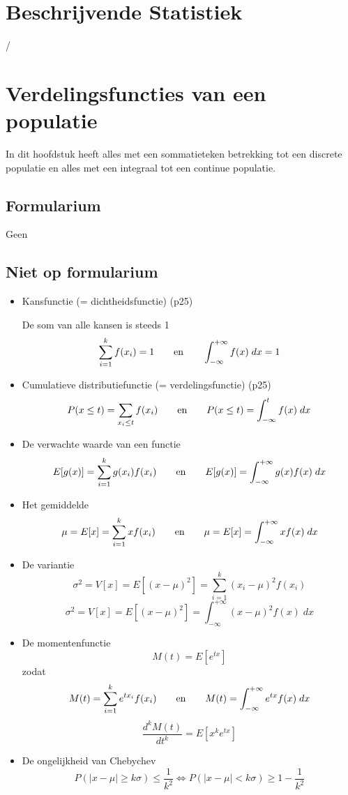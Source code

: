\documentclass[12pt]{report}
\begin{document}
\chapter{Beschrijvende Statistiek}
/
\chapter{Verdelingsfuncties van een populatie}
In dit hoofdstuk heeft alles met een sommatieteken betrekking tot een discrete populatie en alles met een integraal tot een continue populatie.
 \section{Formularium}
 Geen
 \section{Niet op formularium}
 \begin{itemize}
  \item Kansfunctie (= dichtheidsfunctie) (p25)
  
    De som van alle kansen is steeds 1
    $$\sum_{i=1}^k f(x_i) = 1 \qquad \hbox{en}\qquad \int_{-\infty}^{+\infty}f(x)\;dx = 1$$
  \item Cumulatieve distributiefunctie (= verdelingsfunctie) (p25)
    $$P(x \leq t) = \sum_{x_i \leq t}f(x_i) \qquad\hbox{en}\qquad P(x \leq t) = \int_{-\infty}^{t}f(x)\;dx$$
  \item De verwachte waarde van een functie
    $$E[g(x)] = \sum_{i = 1}^{k}g(x_i)f(x_i) \qquad\hbox{en}\qquad E[g(x)] = \int_{-\infty}^{+\infty}g(x)f(x)\;dx$$
  \item Het gemiddelde
    $$\mu = E[x] = \sum_{i = 1}^{k}xf(x_i)\qquad\hbox{en}\qquad \mu = E[x] = \int_{-\infty}^{+\infty}xf(x)\;dx$$
  \item De variantie
    $$\sigma^2 = V[x] = E[(x - \mu)^2] = \sum_{i = 1}^{k}(x_i - \mu)^2f(x_i)$$
    $$\sigma^2 = V[x] = E[(x - \mu)^2] = \int_{-\infty}^{+\infty}(x - \mu)^2f(x)\;dx$$
  \item De momentenfunctie
    $$M(t) = E[e^{tx}]$$
    zodat
    $$M(t) = \sum_{i = 1}^{k}e^{tx_i}f(x_i)\qquad\hbox{en}\qquad M(t) = \int_{-\infty}^{+\infty}e^{tx}f(x)\;dx$$
    $$\frac{d^kM(t)}{dt^k} = E[x^ke^{tx}]$$
  \item De ongelijkheid van Chebychev
    $$P(|x - \mu| \geq k\sigma) \leq \frac{1}{k^2} \Leftrightarrow P(|x - \mu| < k\sigma) \geq 1 - \frac{1}{k^2}$$
    
 \end{itemize}
\end{document}
